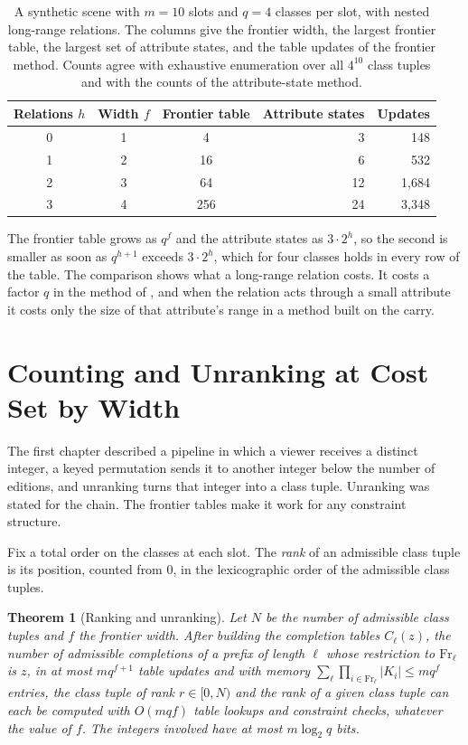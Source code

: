 \documentclass[11pt,twoside,openright]{book}
\theoremstyle{plain}
\newtheorem{theorem}{Theorem}[chapter]
\theoremstyle{definition}
\theoremstyle{remark}
\newcommand{\Fr}{\mathrm{Fr}}
\begin{document}
\begin{table}[ht]
\centering
\begin{tabular}{@{}cccrr@{}}
\toprule
Relations $h$ & Width $f$ & Frontier table & Attribute states & Updates\\
\midrule
0 & 1 & 4 & 3 & 148\\
1 & 2 & 16 & 6 & 532\\
2 & 3 & 64 & 12 & 1,684\\
3 & 4 & 256 & 24 & 3,348\\
\bottomrule
\end{tabular}
\caption{A synthetic scene with $m=10$ slots and $q=4$ classes per slot, with nested long-range relations. The columns give the frontier width, the largest frontier table, the largest set of attribute states, and the table updates of the frontier method. Counts agree with exhaustive enumeration over all $4^{10}$ class tuples and with the counts of the attribute-state method.}\label{tab:synthetic}
\end{table}

The frontier table grows as $q^{f}$ and the attribute states as $3\cdot2^{h}$, so the second is smaller as soon as $q^{h+1}$ exceeds $3\cdot2^h$, which for four classes holds in every row of the table. The comparison shows what a long-range relation costs. It costs a factor $q$ in the method of , and when the relation acts through a small attribute it costs only the size of that attribute's range in a method built on the carry.

\section{Counting and Unranking at Cost Set by Width}\label{sec:unrank}

The first chapter described a pipeline in which a viewer receives a distinct integer, a keyed permutation sends it to another integer below the number of editions, and unranking turns that integer into a class tuple. Unranking was stated for the chain. The frontier tables make it work for any constraint structure.

Fix a total order on the classes at each slot. The \emph{rank} of an admissible class tuple is its position, counted from $0$, in the lexicographic order of the admissible class tuples.

\begin{theorem}[Ranking and unranking]\label{thm:rank}
Let $N$ be the number of admissible class tuples and $f$ the frontier width. After building the completion tables $C_\ell(z)$, the number of admissible completions of a prefix of length $\ell$ whose restriction to $\Fr_\ell$ is $z$, in at most $mq^{f+1}$ table updates and with memory $\sum_\ell\prod_{i\in\Fr_\ell}\lvert K_i\rvert\le mq^f$ entries, the class tuple of rank $r\in[0,N)$ and the rank of a given class tuple can each be computed with $O(mqf)$ table lookups and constraint checks, whatever the value of $f$. The integers involved have at most $m\log_2q$ bits.
\end{theorem}
\end{document}
